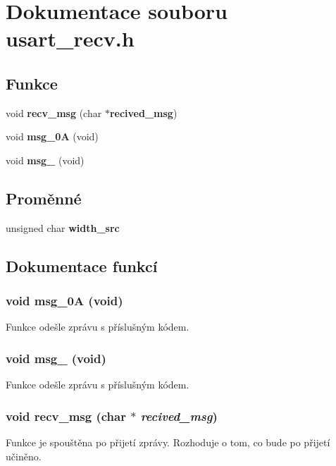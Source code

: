 \section{Dokumentace souboru usart\_\-recv.h}
\label{usart__recv_8h}
\subsection*{Funkce}
\begin{DoxyCompactItemize}
\item 
void {\bf recv\_\-msg} (char $\ast${\bf recived\_\-msg})
\item 
void {\bf msg\_\-0A} (void)
\item 
void {\bf msg\_} (void)
\end{DoxyCompactItemize}
\subsection*{Proměnné}
\begin{DoxyCompactItemize}
\item 
unsigned char {\bf width\_\-src}
\end{DoxyCompactItemize}


\subsection{Dokumentace funkcí}
\subsubsection[{msg\_\-0A}]{\setlength{\rightskip}{0pt plus 5cm}void msg\_\-0A (void)}\label{usart__recv_8h_ad3b266182705026567b1a68e620045c2}
Funkce odešle zprávu s příslušným kódem. 
\subsubsection[{msg\_\-14}]{\setlength{\rightskip}{0pt plus 5cm}void msg\_ (void)}\label{usart__recv_8h_a87d414e7cbc9fdef2f5e9e1e645dc7e5}
Funkce odešle zprávu s příslušným kódem. 
\subsubsection[{recv\_\-msg}]{\setlength{\rightskip}{0pt plus 5cm}void recv\_\-msg (char $\ast$ {\em recived\_\-msg})}\label{usart__recv_8h_a8c511fa0fa24a5d675b8142ffc483ecb}
Funkce je spouštěna po přijetí zprávy. Rozhoduje o tom, co bude po přijetí učiněno. 

